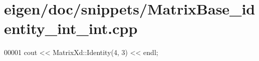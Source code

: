 \hypertarget{eigen_2doc_2snippets_2_matrix_base__identity__int__int_8cpp_source}{}\section{eigen/doc/snippets/\+Matrix\+Base\+\_\+identity\+\_\+int\+\_\+int.cpp}
\label{eigen_2doc_2snippets_2_matrix_base__identity__int__int_8cpp_source}

\begin{DoxyCode}
00001 cout << MatrixXd::Identity(4, 3) << endl;
\end{DoxyCode}
